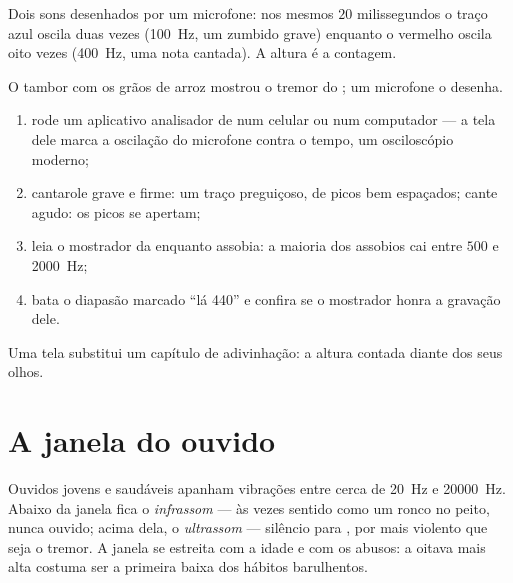 \begin{omfigure}

{\small Dois sons desenhados por um microfone: nos mesmos $20$
milissegundos o traço azul oscila duas vezes (\qty{100}{Hz}, um
zumbido grave) enquanto o vermelho oscila oito vezes (\qty{400}{Hz},
uma nota cantada). A altura é a contagem.}
\end{omfigure}

\begin{method}\label{met:g8:sound-pitch-loudness:seeing}
O tambor com os grãos de arroz mostrou o tremor do ; um microfone o
desenha.
\begin{enumerate}
  \item rode um aplicativo analisador de  num celular ou num
        computador --- a tela dele marca a oscilação do microfone
        contra o tempo, um osciloscópio moderno;
  \item cantarole grave e firme: um traço preguiçoso, de picos bem
        espaçados; cante agudo: os picos se apertam;
  \item leia o mostrador da  enquanto assobia: a maioria
        dos assobios cai entre $500$ e \qty{2000}{Hz};
  \item bata o diapasão marcado ``lá 440'' e confira se o mostrador
        honra a gravação dele.
\end{enumerate}
Uma tela substitui um capítulo de adivinhação: a altura contada
diante dos seus olhos.
\end{method}

\section{A janela do ouvido}

\begin{proposition}\label{prop:g8:sound-pitch-loudness:range}
Ouvidos jovens e saudáveis apanham vibrações entre cerca de
\qty{20}{Hz} e \qty{20000}{Hz}. Abaixo da janela fica o
\emph{infrassom} --- às vezes sentido como um ronco
no peito, nunca ouvido; acima dela, o
\emph{ultrassom} --- silêncio para , por mais
violento que seja o tremor. A janela se estreita com a idade e com os
abusos: a oitava mais alta costuma ser a primeira baixa dos hábitos
barulhentos.
\end{proposition}


